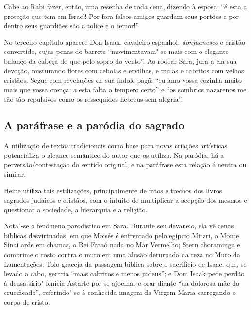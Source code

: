 \documentclass[12pt]{extarticle}
\begin{document}


Cabe ao Rabi fazer, então, uma resenha de toda cena, dizendo à esposa:
``é esta a proteção que tem em Israel! Por fora falsos amigos guardam
seus portões e por dentro seus guardiães são a tolice e o temor!''

No terceiro capítulo aparece Don Isaak, cavaleiro espanhol, \emph{donjuanesco}
e cristão convertido, cujas penas do barrete ``movimentavam"-se mais com
o elegante balanço da cabeça do que pelo sopro do vento''. Ao rodear
Sara, jura a ela sua devoção, misturando flores com cebolas e ervilhas,
e mulas e cabritos com velhos cristãos. Segue com revelações de sua
índole pagã: ``eu amo vossa cozinha muito mais que vossa crença; a esta
falta o tempero certo'' e ``os sombrios nazarenos me são tão repulsivos
como os ressequidos hebreus sem alegria''.








\subsection{A paráfrase e a paródia do sagrado}

A utilização de textos tradicionais como base para novas criações
artísticas potencializa o alcance semântico do autor que os utiliza. Na
paródia, há a perversão/contestação do sentido original, e na paráfrase
esta relação é neutra ou similar.

Heine utiliza tais estilizações, principalmente de fatos e trechos dos
livros sagrados judaicos e cristãos, com o intuito de multiplicar a
acepção dos mesmos e questionar a sociedade, a hierarquia e a religião.

Nota"-se o fenômeno parodístico em Sara. Durante seu devaneio, ela vê cenas
bíblicas desvirtuadas, em que Moisés é enfrentado pelo egípcio Mitzri, o
Monte Sinai arde em chamas, o Rei Faraó nada no Mar Vermelho; Stern
choraminga e comprime o rosto contra o muro em uma alusão deturpada da
reza no Muro da Lamentações; Tolo graceja da passagem bíblica sobre o
sacrifício de Isaac, que, se levado a cabo, geraria ``mais cabritos e
menos judeus''; e Dom Isaak pede perdão à deusa sírio"-fenícia Astarte
por se ajoelhar e orar diante ``da dolorosa mãe do crucificado'',
referindo"-se à conhecida imagem da Virgem Maria carregando o corpo de
cristo.
\end{document}
